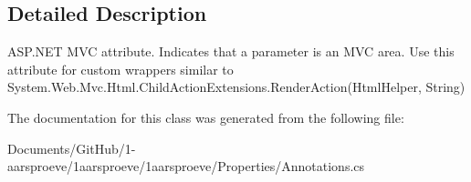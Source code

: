 \subsection{Detailed Description}
A\+S\+P.\+N\+E\+T M\+V\+C attribute. Indicates that a parameter is an M\+V\+C area. Use this attribute for custom wrappers similar to {\ttfamily System.\+Web.\+Mvc.\+Html.\+Child\+Action\+Extensions.\+Render\+Action(\+Html\+Helper, String)} 



The documentation for this class was generated from the following file\+:\begin{DoxyCompactItemize}
\item 
Documents/\+Git\+Hub/1-\/aarsproeve/1aarsproeve/1aarsproeve/\+Properties/Annotations.\+cs\end{DoxyCompactItemize}
